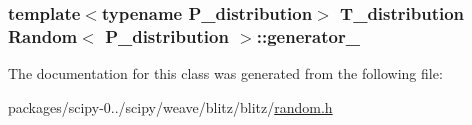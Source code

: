 \subsubsection[{generator\+\_\+}]{\setlength{\rightskip}{0pt plus 5cm}template$<$typename P\+\_\+distribution$>$ {\bf T\+\_\+distribution} {\bf Random}$<$ P\+\_\+distribution $>$\+::generator\+\_\+\hspace{0.3cm}{\ttfamily [protected]}}\label{classRandom_a31e29edc3f3d9aff69a5f0735c0ad13e}


The documentation for this class was generated from the following file\+:\begin{DoxyCompactItemize}
\item 
packages/scipy-\/0../scipy/weave/blitz/blitz/\hyperlink{weave_2blitz_2blitz_2random_8h}{random.\+h}\end{DoxyCompactItemize}
